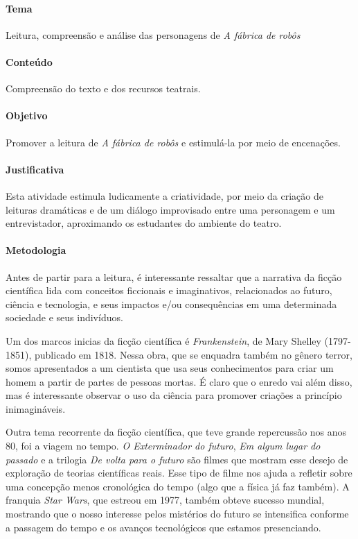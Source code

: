 \documentclass[11pt]{extarticle}
\begin{document}
\paragraph{Tema} Leitura, compreensão e análise das personagens de \textit{A fábrica de robôs}

\paragraph{Conteúdo} Compreensão do texto e dos recursos teatrais.

\paragraph{Objetivo} Promover a leitura de \textit{A fábrica de robôs} e estimulá-la por meio de encenações. 

\paragraph{Justificativa} Esta atividade estimula ludicamente a criatividade, por meio da criação de leituras dramáticas e de um diálogo improvisado entre uma personagem e um entrevistador, aproximando os estudantes do ambiente do teatro.         

\paragraph{Metodologia} Antes de partir para a leitura, é interessante ressaltar que a narrativa da ficção científica lida com conceitos ficcionais e imaginativos, relacionados ao futuro, ciência e tecnologia, e seus impactos e/ou consequências em uma determinada sociedade e seus indivíduos. 

Um dos marcos inicias da ficção científica é \textit{Frankenstein}, de Mary Shelley (1797-1851), publicado em 1818. Nessa obra, que se enquadra também no gênero terror, somos apresentados a um cientista que usa seus conhecimentos para criar um homem a partir de partes de pessoas mortas. É claro que o enredo vai além disso, mas é interessante observar o uso da ciência para promover criações a princípio inimagináveis. 

Outra tema recorrente da ficção científica, que teve grande repercussão nos anos 80, foi a viagem no tempo. \textit{O Exterminador do futuro}, \textit{Em algum lugar do passado} e a trilogia \textit{De volta para o futuro} são filmes que mostram esse desejo de exploração de teorias científicas reais. Esse tipo de filme nos ajuda a refletir sobre uma concepção menos cronológica do tempo (algo que a física já faz também). A franquia \textit{Star Wars}, que estreou em 1977, também obteve sucesso mundial, mostrando que o nosso interesse pelos mistérios do futuro se intensifica conforme a passagem do tempo e os avanços tecnológicos que estamos presenciando. 
\end{document}
